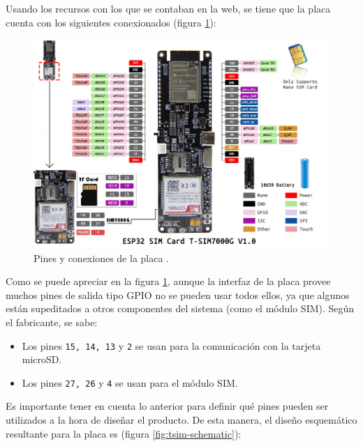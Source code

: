 Usando los recursos con los que se contaban en la web, se tiene que la placa cuenta
con los siguientes conexionados (figura \ref{fig:pinout}):

\begin{figure}[H]
  \centering
  \includegraphics[width=\linewidth]{images/pinout.jpg}
  \caption{Pines y conexiones de la placa \cite{4269LILYGO}.}
  \label{fig:pinout}
\end{figure}

Como se puede apreciar en la figura \ref{fig:pinout}, aunque la interfaz de la
placa provee muchos pines de salida tipo \ac{GPIO} no se pueden usar todos ellos,
ya que algunos están supeditados a otros componentes del sistema (como el módulo SIM).
Según el fabricante, se sabe:

\begin{itemize}
  \item Los pines \texttt{15, 14, 13} y \texttt{2} se usan para la comunicación con
        la tarjeta microSD.
  \item Los pines \texttt{27, 26} y \texttt{4} se usan para el módulo SIM.
\end{itemize}

Es importante tener en cuenta lo anterior para definir qué pines pueden ser utilizados
a la hora de diseñar el producto. De esta manera, el diseño esquemático resultante
para la placa es (figura \ref{fig:tsim-schematic}):

